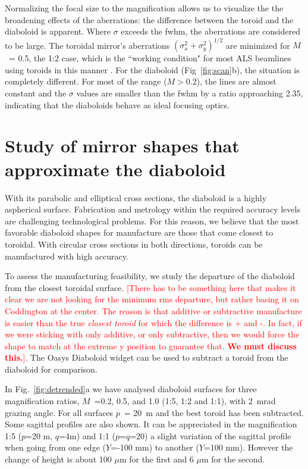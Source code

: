 \documentclass{iucr}       %
\begin{document}
Normalizing the focal size to the magnification allows us to visualize the the broadening effects of the aberrations: the difference between the toroid and the diaboloid is apparent. Where $\sigma$ exceeds the fwhm, the aberrations are considered to be large. The toroidal mirror's aberrations $(\sigma_x^2 + \sigma_y^2)^{1/2}$ are minimized for $M$~= 0.5, the 1:2 case, which is the ``working condition" for most ALS beamlines using toroids in this manner \cite{MacDowell2004}. For the diaboloid (Fig~\ref{fig:scan}b), the situation is completely different. For most of the range ($M > 0.2$), the lines are almost constant and the $\sigma$ values are smaller than the fwhm by a ratio approaching 2.35, indicating that the diaboloids behave as ideal focusing optics.


\section{Study of mirror shapes that approximate the diaboloid}
\label{sec:approximatedShapes}

With its parabolic and elliptical cross sections, the diaboloid is a highly aspherical surface. Fabrication and metrology within the required accuracy levels are challenging technological problems. For this reason, we believe that the most favorable diaboloid shapes for manufacture are those that come closest to toroidal. With circular cross sections in both directions, toroids can be manufactured with high accuracy.

To assess the manufacturing feasibility, we study the departure of the diaboloid from the closest toroidal surface. \textcolor{red}{[There has to be something here that makes it clear we are not looking for the minimum rms departure, but rather basing it on Coddington at the center. The reason is that additive or subtractive manufacture is easier than the true \textit{closest toroid} for which the difference is + and -. In fact, if we were sticking with only additive, or only subtractive, then we would force the shape to match at the extreme y position to guarantee that. \textbf{We must discuss this.}]}. The Oasys Diaboloid widget can be used to subtract a toroid from the diaboloid for comparison.

In Fig.~\ref{fig:detrended}a we have analysed diaboloid surfaces for three magnification ratios, $M$~=0.2, 0.5, and 1.0 (1:5, 1:2 and 1:1), with \SI{2}{\milli\radian} grazing angle. For all surfaces $p$~= \SI{20}{\meter} and the best toroid has been subtracted. Some sagittal profiles are also shown. It can be appreciated in the magnification 1:5 ($p$=20 m, $q$=4m) and 1:1 ($p$=$q$=20) a slight variation of the sagittal profile when going from one edge ($Y$=-100 mm) to another ($Y$=100 mm). However the change of height is about 100 $\mu$m for the first and 6 $\mu$m for the second. 
\end{document}
